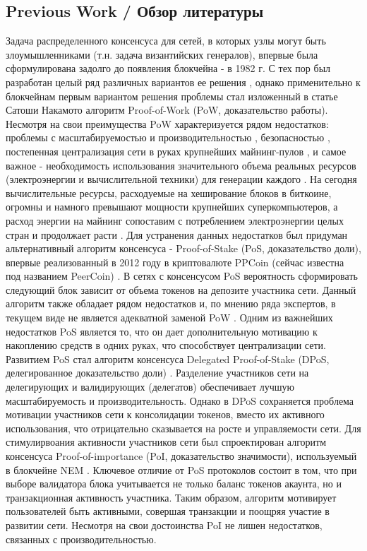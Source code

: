 \documentclass[a4paper,12pt]{article}
\begin{document}
\subsection{Previous Work / Обзор литературы}
Задача распределенного консенсуса для сетей, в которых узлы могут быть злоумышленниками (т.н. задача византийских генералов), впервые была сформулирована задолго до появления блокчейна - в 1982 г. \cite{Lamport} С тех пор был разработан целый ряд различных вариантов ее решения \cite{Castro}, однако применительно к блокчейнам первым вариантом решения проблемы стал изложенный в статье Сатоши Накамото \cite{satoshi} алгоритм Proof-of-Work (PoW, доказательство работы). Несмотря на свои преимущества PoW характеризуется рядом недостатков: проблемы с масштабируемостью и производительностью \cite{Croman}, безопасностью \cite{Eyal}, постепенная централизация сети в руках крупнейших майнинг-пулов \cite{Buterin}, и самое важное - необходимость использования значительного объема реальных ресурсов (электроэнергии и вычислительной техники) для генерации каждого \cite{Bentov}. На сегодня вычислительные ресурсы, расходуемые на хеширование блоков в биткоине, огромны и намного превышают мощности крупнейших суперкомпьютеров, а расход энергии на майнинг сопоставим с потреблением электроэнергии целых стран и продолжает расти \cite{energy}.
Для устранения данных недостатков был придуман альтернативный алгоритм консенсуса - Proof-of-Stake (PoS, доказательство доли), впервые реализованный в 2012 году в криптовалюте PPCoin (сейчас известна под названием PeerCoin) \cite{Ppcoin}. В сетях с консенсусом PoS вероятность сформировать следующий блок зависит от объема токенов на депозите участника сети. Данный алгоритм также обладает рядом недостатков и, по мнению ряда экспертов, в текущем виде не является адекватной заменой PoW \cite{Demeester} \cite{Poelstra}. Одним из важнейших недостатков PoS является то, что он дает дополнительную мотивацию к накоплению средств в одних руках, что способствует централизации сети.
Развитием PoS стал алгоритм консенсуса Delegated Proof-of-Stake (DPoS, делегированное доказательство доли) \cite{dantheman}. Разделение участников сети на делегирующих и валидирующих (делегатов) обеспечивает лучшую масштабируемость и производительность. Однако в DPoS сохраняется проблема мотивации участников сети к консолидации токенов, вместо их активного использования, что отрицательно сказывается на росте и управляемости сети.
Для стимулирвоания активности участников сети был спроектирован алгоритм консенсуса Proof-of-importance (PoI, доказательство значимости), используемый в блокчейне NEM \cite{nem}. Ключевое отличие от PoS протоколов состоит в том, что при выборе валидатора блока учитывается не только баланс токенов акаунта, но и транзакционная активность участника. Таким образом, алгоритм мотивирует пользователей быть активными, совершая транзакции и поощряя участие в развитии сети. Несмотря на свои достоинства PoI не лишен недостатков, связанных с производительностью. 
\end{document}
